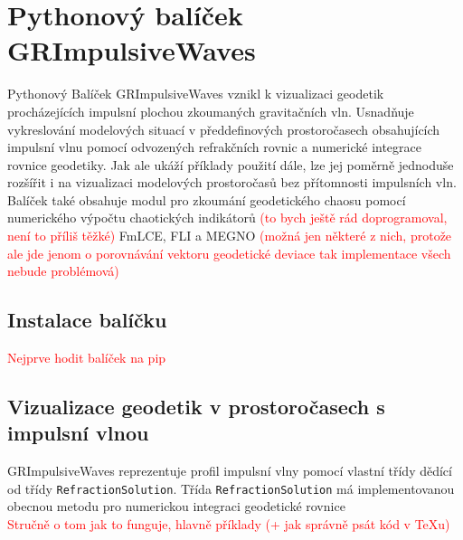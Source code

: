 \section{Pythonový balíček GRImpulsiveWaves}
Pythonový Balíček GRImpulsiveWaves vznikl k vizualizaci geodetik procházejících impulsní plochou zkoumaných gravitačních vln.
Usnadňuje vykreslování modelových situací v předdefinových prostoročasech obsahujících impulsní vlnu pomocí
odvozených refrakčních rovnic a numerické integrace rovnice geodetiky. Jak ale ukáží příklady použití dále, lze
jej poměrně jednoduše rozšířit i na vizualizaci modelových prostoročasů bez přítomnosti impulsních vln.
Balíček také obsahuje modul pro zkoumání geodetického chaosu pomocí numerického výpočtu chaotických indikátorů
\textcolor{red}{(to bych ještě rád doprogramoval, není to příliš těžké)} FmLCE, FLI a MEGNO \textcolor{red}{(možná jen některé z nich,
protože ale jde jenom o porovnávání vektoru geodetické deviace tak implementace všech nebude problémová)}

\subsection{Instalace balíčku}
\textcolor{red}{Nejprve hodit balíček na pip}

\subsection{Vizualizace geodetik v prostoročasech s impulsní vlnou}
GRImpulsiveWaves reprezentuje profil impulsní vlny pomocí vlastní třídy dědící od třídy \verb|RefractionSolution|.
Třída \verb|RefractionSolution| má implementovanou obecnou metodu pro numerickou integraci geodetické rovnice\\
\textcolor{red}{Stručně o tom jak to funguje, hlavně příklady (+ jak správně psát kód v TeXu)}

